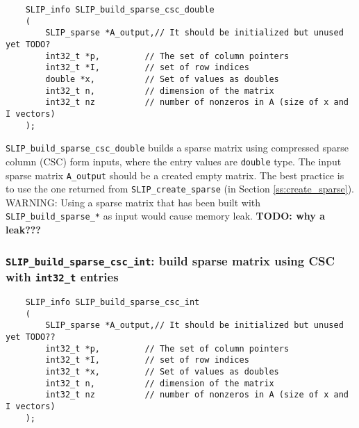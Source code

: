 \documentclass[12pt]{article}
\theoremstyle{definition}
\begin{document}

\begin{mdframed}[userdefinedwidth=6in]
{\footnotesize
\begin{verbatim}
    SLIP_info SLIP_build_sparse_csc_double
    (
        SLIP_sparse *A_output,// It should be initialized but unused yet TODO?
        int32_t *p,         // The set of column pointers
        int32_t *I,         // set of row indices
        double *x,          // Set of values as doubles
        int32_t n,          // dimension of the matrix
        int32_t nz          // number of nonzeros in A (size of x and I vectors)
    );
\end{verbatim}
} \end{mdframed}

\verb|SLIP_build_sparse_csc_double| builds a sparse matrix using compressed
sparse column (CSC) form inputs, where the entry values are \verb|double| type.
The input sparse matrix \verb|A_output| should be a created empty matrix. The
best practice is to use the one returned from \verb|SLIP_create_sparse| (in
Section \ref{ss:create_sparse}). WARNING: Using a sparse matrix that has been
built with \verb|SLIP_build_sparse_*| as input would cause memory leak.
{\bf TODO: why a leak???} %

\cprotect\subsubsection{\verb|SLIP_build_sparse_csc_int|: build sparse matrix using CSC with \verb|int32_t| entries}
\label{s:user:build_sparse_csc_int}

\begin{mdframed}[userdefinedwidth=6in]
{\footnotesize
\begin{verbatim}
    SLIP_info SLIP_build_sparse_csc_int
    (
        SLIP_sparse *A_output,// It should be initialized but unused yet TODO??
        int32_t *p,         // The set of column pointers
        int32_t *I,         // set of row indices
        int32_t *x,         // Set of values as doubles
        int32_t n,          // dimension of the matrix
        int32_t nz          // number of nonzeros in A (size of x and I vectors)
    );
\end{verbatim}
} \end{mdframed}
\end{document}
